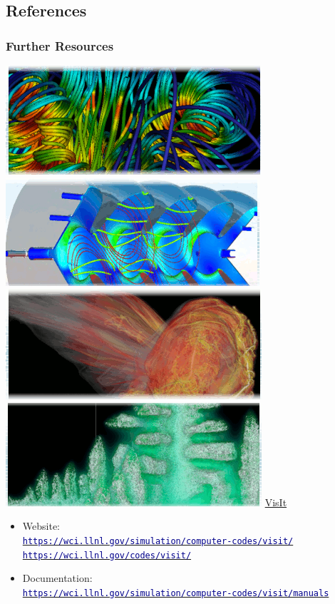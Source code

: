 \subsection{References}
\begin{frame}
\frametitle{Further Resources}
	\vspace{-.75mm}
	\begin{beamerboxesrounded}[upper=block head,lower=block body,shadow=true]{ 
		\href{https://wci.llnl.gov/simulation/computer-codes/visit/}{\includegraphics[height=.85cm]{figs/visit-logos/VisIt-01}}
                \href{https://wci.llnl.gov/simulation/computer-codes/visit/}{\includegraphics[height=.85cm]{figs/visit-logos/VisIt-02}}
                \href{https://wci.llnl.gov/simulation/computer-codes/visit/}{\includegraphics[height=.85cm]{figs/visit-logos/VisIt-03}}
                \href{https://wci.llnl.gov/simulation/computer-codes/visit/}{\includegraphics[height=.85cm]{figs/visit-logos/VisIt-04}}
		\href{https://wci.llnl.gov/simulation/computer-codes/visit}{VisIt}}
	\begin{itemize}
        \item[\ding{224}] Website:        \\
                \href{https://wci.llnl.gov/simulation/computer-codes/visit/}{\textcolor{DarkBlue}{\small\tt https://wci.llnl.gov/simulation/computer-codes/visit/}}	\\
		\href{https://wci.llnl.gov/codes/visit/}{\textcolor{DarkBlue}{\small\tt https://wci.llnl.gov/codes/visit/}}

	\item[\ding{224}] Documentation:	\\
		\href{https://wci.llnl.gov/simulation/computer-codes/visit/manuals}{\textcolor{DarkBlue}{\small\tt https://wci.llnl.gov/simulation/computer-codes/visit/manuals}}


\end{itemize}
\end{beamerboxesrounded}
\end{frame}
